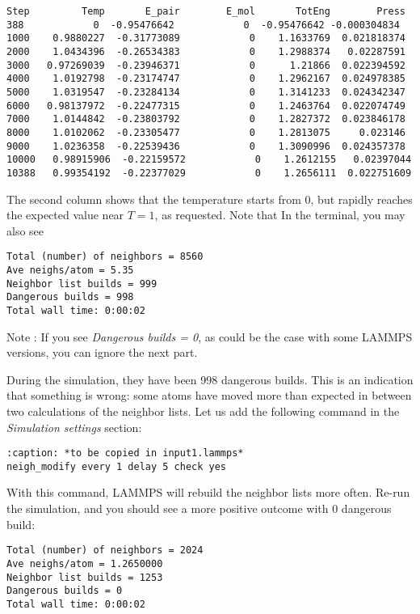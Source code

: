 \begin{verbatim}
Step         Temp       E_pair        E_mol       TotEng        Press
388            0  -0.95476642            0  -0.95476642 -0.000304834
1000    0.9880227  -0.31773089            0    1.1633769  0.021818374 
2000    1.0434396  -0.26534383            0    1.2988374   0.02287591 
3000   0.97269039  -0.23946371            0      1.21866  0.022394592 
4000    1.0192798  -0.23174747            0    1.2962167  0.024978385 
5000    1.0319547  -0.23284134            0    1.3141233  0.024342347 
6000   0.98137972  -0.22477315            0    1.2463764  0.022074749 
7000    1.0144842  -0.23803792            0    1.2827372  0.023846178 
8000    1.0102062  -0.23305477            0    1.2813075     0.023146 
9000    1.0236358  -0.22539436            0    1.3090996  0.024357378 
10000   0.98915906  -0.22159572            0    1.2612155   0.02397044 
10388   0.99354192  -0.22377029            0    1.2656111  0.022751609 
\end{verbatim}

\noindent The second column shows that the temperature
starts from 0, but rapidly reaches the
expected value near $T=1$, as requested. 
Note that  In the terminal, you may also see

\begin{verbatim}
Total (number) of neighbors = 8560
Ave neighs/atom = 5.35
Neighbor list builds = 999
Dangerous builds = 998
Total wall time: 0:00:02
\end{verbatim}

\noindent Note : If you see \textit{Dangerous builds = 0}, as could be
the case with some LAMMPS versions, you can ignore
the next part.

During the simulation, they have been 998 dangerous builds.
This is an indication that something is wrong: some atoms
have moved more than expected in between two calculations of
the neighbor lists. Let us add the following command in the
\textit{Simulation settings} section:

\begin{verbatim}
:caption: *to be copied in input1.lammps*
neigh_modify every 1 delay 5 check yes
\end{verbatim}

\noindent With this command, LAMMPS will rebuild the neighbor lists
more often. Re-run the simulation, and you should see a more
positive outcome with 0 dangerous build:

\begin{verbatim}
Total (number) of neighbors = 2024
Ave neighs/atom = 1.2650000
Neighbor list builds = 1253
Dangerous builds = 0
Total wall time: 0:00:02
\end{verbatim}

